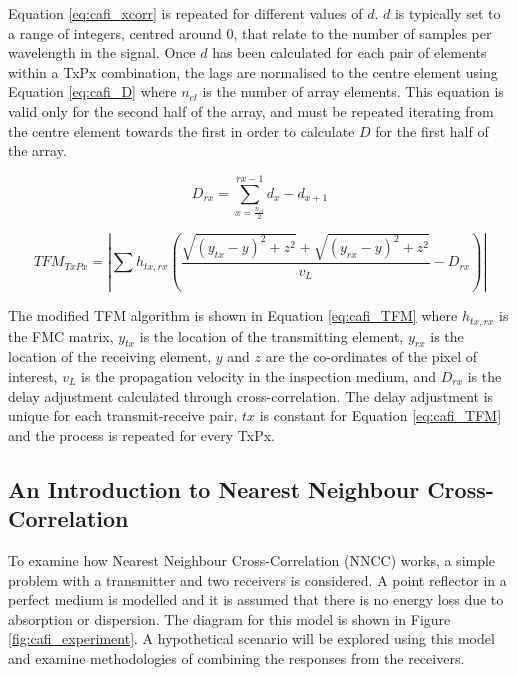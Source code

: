 Equation \ref{eq:cafi_xcorr} is repeated for different values of $d$. $d$ is typically set to a range of integers, centred around 0, that relate to the number of samples per wavelength in the signal. Once $d$ has been calculated for each pair of elements within a TxPx combination, the lags are normalised to the centre element using Equation \ref{eq:cafi_D} where $n_{el}$ is the number of array elements. This equation is valid only for the second half of the array, and must be repeated iterating from the centre element towards the first in order to calculate $D$ for the first half of the array.

\begin{equation} \label{eq:cafi_D}
D_{rx} = \sum\limits_{x=\frac{n_{el}}{2}}^{rx-1} d_x - d_{x+1}
 \end{equation}

 \begin{equation} \label{eq:cafi_TFM}
TFM_{TxPx} = | \sum h_{tx,rx} (\frac{\sqrt{(y_{tx} - y)^2 + z^2} + \sqrt{(y_{rx} - y)^2 + z^2}}{v_L} - D_{rx}) |
 \end{equation}

The modified TFM algorithm is shown in Equation \ref{eq:cafi_TFM} where $h_{tx,rx}$ is the FMC matrix, $y_{tx}$ is the location of the transmitting element, $y_{rx}$ is the location of the receiving element, $y$ and $z$ are the co-ordinates of the pixel of interest, $v_L$ is the propagation velocity in the inspection medium, and $D_{rx}$ is the delay adjustment calculated through cross-correlation. The delay adjustment is unique for each transmit-receive pair. $tx$ is constant for Equation \ref{eq:cafi_TFM} and the process is repeated for every TxPx.


\subsection{An Introduction to Nearest Neighbour Cross-Correlation}

To examine how Nearest Neighbour Cross-Correlation (NNCC) works, a simple problem with a transmitter and two receivers is considered. A point reflector in a perfect medium is modelled and it is assumed that there is no energy loss due to absorption or dispersion. The diagram for this model is shown in Figure \ref{fig:cafi_experiment}. A hypothetical scenario will be explored using this model and examine methodologies of combining the responses from the receivers.

